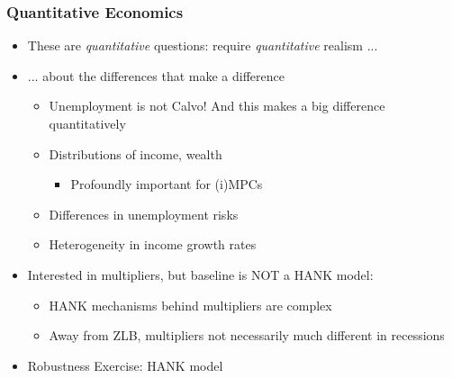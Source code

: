 \documentclass[pdflatex,aspectratio=169, handout]{beamer}
\begin{document}
\begin{frame}
  \frametitle{Quantitative Economics}
  \begin{itemize}[<+->]
  	\itemsep = .75\bigskipamount 
    \item These are \textit{quantitative} questions: require \textit{quantitative} realism ...
    \item ... about the differences that make a difference
    \begin{itemize}[<+->]
    \itemsep = .25\bigskipamount 
    \item Unemployment is not Calvo! And this makes a big difference quantitatively
    \item Distributions of income, wealth
      \begin{itemize}
      \item Profoundly important for (i)MPCs
      \end{itemize} 
      \item Differences in unemployment risks
      \item Heterogeneity in income growth rates
  \end{itemize}
\end{itemize}


\begin{itemize}[<+->]
  \item Interested in multipliers, but baseline is NOT a HANK model:
    \begin{itemize}[<+->]
    \itemsep = .25\bigskipamount 	
    \item HANK mechanisms behind multipliers are complex
    \item Away from ZLB, multipliers not necessarily much different in recessions
    \end{itemize}
  \end{itemize}
  
  \begin{itemize}[<+->]
    \itemsep = .25\bigskipamount 
    \item Robustness Exercise: HANK model 
    \end{itemize}
\end{frame}
\end{document}
